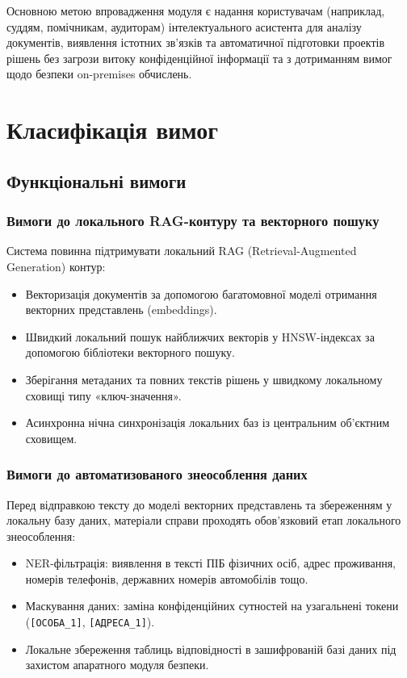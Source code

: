 \documentclass{article}
\begin{document}
Основною метою впровадження модуля є надання користувачам (наприклад, суддям, помічникам, аудиторам)
інтелектуального асистента для аналізу документів, виявлення істотних зв'язків та автоматичної
підготовки проектів рішень без загрози витоку конфіденційної інформації та з дотриманням вимог щодо безпеки on-premises обчислень.

\newpage
\section{Класифікація вимог}

\subsection{Функціональні вимоги}

\subsubsection{Вимоги до локального RAG-контуру та векторного пошуку}
Система повинна підтримувати локальний RAG (Retrieval-Augmented Generation) контур:
\begin{itemize}
    \item Векторизація документів за допомогою багатомовної моделі отримання векторних представлень (embeddings).
    \item Швидкий локальний пошук найближчих векторів у HNSW-індексах за допомогою бібліотеки векторного пошуку.
    \item Зберігання метаданих та повних текстів рішень у швидкому локальному сховищі типу «ключ-значення».
    \item Асинхронна нічна синхронізація локальних баз із центральним об'єктним сховищем.
\end{itemize}

\subsubsection{Вимоги до автоматизованого знеособлення даних}
Перед відправкою тексту до моделі векторних представлень та збереженням у локальну базу даних, матеріали справи проходять обов'язковий етап локального знеособлення:
\begin{itemize}
    \item NER-фільтрація: виявлення в тексті ПІБ фізичних осіб, адрес проживання, номерів телефонів, державних номерів автомобілів тощо.
    \item Маскування даних: заміна конфіденційних сутностей на узагальнені токени (\texttt{[ОСОБА\_1]}, \texttt{[АДРЕСА\_1]}).
    \item Локальне збереження таблиць відповідності в зашифрованій базі даних під захистом апаратного модуля безпеки.
\end{itemize}
\end{document}
